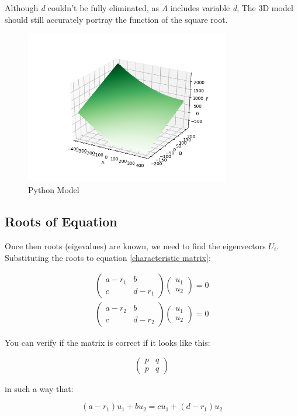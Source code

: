 \documentclass[12pt,letterpaper]{article}
\newcommand{\vectors}[2]{
	\begin{pmatrix}
		#1 \\ #2
	\end{pmatrix}
}
\newcommand{\smatrix}[4]{
	\begin{pmatrix}
		#1 & #2 \\ #3 & #4
	\end{pmatrix}
}
\begin{document}
			Although \emph{d} couldn't be fully eliminated, as \emph{A} includes variable \emph{d}, The 3D model should still accurately portray the function of the square root.


			\begin{figure}[H]
				\centering
				\includegraphics[width=0.8\textwidth]{3Dmodel.png}
				\caption{Python Model}
				\label{fig:3dmodel}
			\end{figure}

		
		\subsection{Roots of Equation}

			Once then roots (eigevalues) are known, we need to find the eigenvectors $U_i$. Substituting the roots to equation \ref{characteristic matrix}:

			\begin{align*}
				\smatrix{a-r_1}{b}{c}{d-r_1} \vectors{u_1}{u_2} = 0 \\ 
				\smatrix{a-r_2}{b}{c}{d-r_2} \vectors{u_1}{u_2} = 0 
			\end{align*}

			You can verify if the matrix is correct if it looks like this:

			\begin{equation*}
				\smatrix{p}{q}{p}{q}
			\end{equation*}

			in such a way that:

			\begin{equation*}
				(a-r_1) u_1 + b u_2 = c u_1 + (d-r_1) u_2
			\end{equation*}
\end{document}
